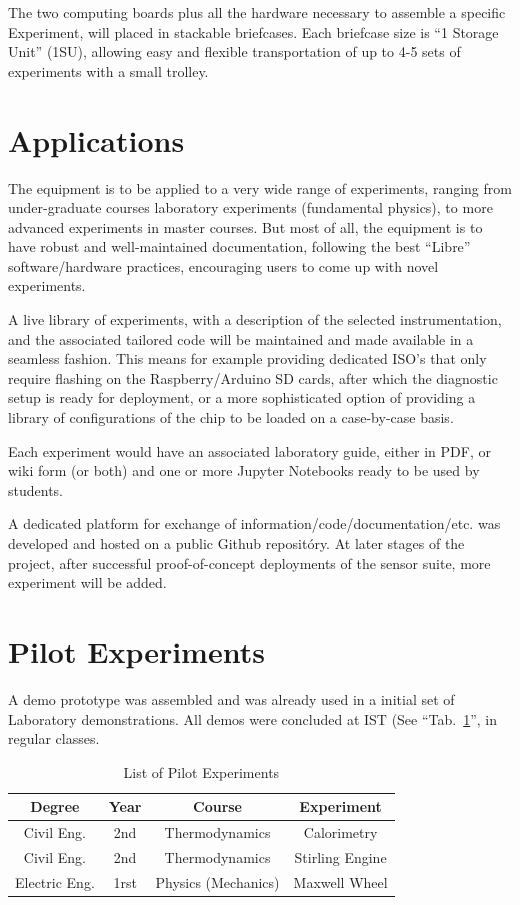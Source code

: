 \documentclass[conference]{IEEEtran}
\begin{document}
The two computing boards plus all the hardware necessary to assemble a specific Experiment, will placed in stackable briefcases.
Each briefcase size is “1 Storage Unit” (1SU), allowing easy and flexible transportation of up to 4-5 sets of experiments with a small trolley.


\section{Applications}
The equipment is to be applied to a very wide range of experiments, ranging from under-graduate courses laboratory experiments (fundamental physics), 
to more advanced experiments in master courses. 
But most of all, the equipment is to have robust and well-maintained documentation, 
following the best “Libre” software/hardware practices, encouraging users to come up with novel experiments.

A live library of experiments, with a description of the selected instrumentation, and the associated tailored code will be maintained and made available in a seamless fashion. 
This means for example providing dedicated ISO’s that only require flashing on the Raspberry/Arduino SD cards, after which the diagnostic setup is ready for deployment,
or a more sophisticated option of providing a library of configurations of the chip to be loaded on a case-by-case basis.

Each experiment would have an associated laboratory guide, either in PDF, or wiki form (or both) and one or more Jupyter\cite{j2} Notebooks ready to be used by students. 

A dedicated platform for exchange of information/code/documentation/etc. was developed and hosted on a public Github\cite{gh} repositóry. 
At later stages of the project, after successful proof-of-concept deployments of the sensor suite, more experiment will be added.


\section{Pilot Experiments}
A demo prototype was assembled and was already used in a initial set of Laboratory demonstrations. 
All demos were concluded at IST (See ``Tab.~\ref{tab1}'', in regular classes.

\begin{table}[htbp]
\caption{List of Pilot Experiments}
\begin{center}
\begin{tabular}{|c|c|c|c|}
\hline
\textbf{Degree}&\textbf{Year}&\textbf{Course} &\textbf{Experiment}\\
\hline
Civil Eng. & 2nd&  Thermodynamics & Calorimetry\\
\hline
Civil Eng. & 2nd&  Thermodynamics & Stirling Engine\\
\hline
 Electric Eng.& 1rst&  Physics (Mechanics) & Maxwell Wheel\\
\hline
\end{tabular}
\label{tab1}
\end{center}
\end{table}
\end{document}
